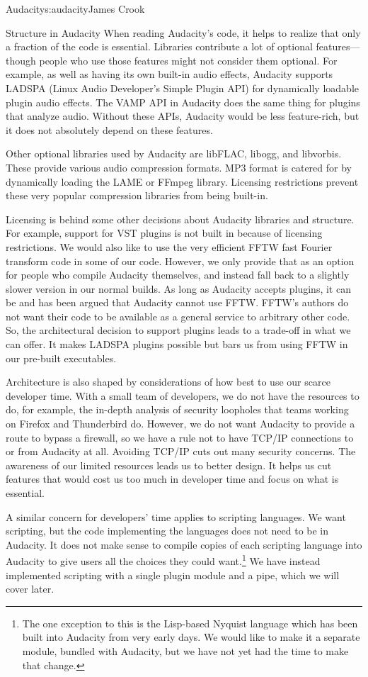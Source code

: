 \begin{aosachapter}{Audacity}{s:audacity}{James Crook}
\begin{aosasect1}{Structure in Audacity}
When reading Audacity's code,
it helps to realize that only a fraction of the code is essential.
Libraries contribute a lot of optional features---though people who
use those features might not consider them optional.  For example, as
well as having its own built-in audio effects, Audacity supports
LADSPA (Linux Audio Developer's Simple Plugin API) for dynamically
loadable plugin audio effects.  The VAMP API in Audacity does the same
thing for plugins that analyze audio.  Without these APIs, Audacity
would be less feature-rich, but it does not absolutely depend on these
features.

Other optional libraries used by Audacity are libFLAC, libogg,
and libvorbis.  These provide various audio compression formats.  MP3
format is catered for by dynamically loading the LAME or FFmpeg
library.  Licensing restrictions prevent these very popular
compression libraries from being built-in.

Licensing is behind some other decisions about Audacity libraries and
structure.  For example, support for VST plugins
is not built in because of licensing restrictions.
We would also like to use the very efficient FFTW
fast Fourier transform code in some of our code.  However, we only
provide that as an option for people who compile Audacity themselves,
and instead fall back to a slightly slower version in our normal
builds.  As long as Audacity accepts plugins, it can be and has been
argued that Audacity cannot use FFTW\@.  FFTW's authors do not want
their code to be available as a general service to arbitrary other
code.  So, the architectural decision to support plugins leads to a
trade-off in what we can offer.  It makes LADSPA plugins possible but
bars us from using FFTW in our pre-built executables.

Architecture is also shaped by considerations of how best to use our
scarce developer time.  With a small team of developers, we do not
have the resources to do, for example, the in-depth analysis of
security loopholes that teams working on Firefox and Thunderbird do.
However, we do not want Audacity to provide a route to bypass a
firewall, so we have a rule not to have TCP/IP connections to or from
Audacity at all.  Avoiding TCP/IP cuts out many security concerns.
The awareness of our limited resources leads us to better design.  
It helps us cut features that would cost us too much in developer 
time and focus on what is essential.

A similar concern for developers' time applies to scripting languages.
We want scripting, but the code implementing the languages does not
need to be in Audacity.  It does not make sense to compile copies of
each scripting language into Audacity to give users all the choices
they could want.\footnote{The one exception to this is the Lisp-based
Nyquist language which has been built into Audacity from very early
days.  We would like to make it a separate module, bundled with
Audacity, but we have not yet had the time to make that change.}
We have instead implemented scripting with a single plugin module and a
pipe, which we will cover later.


\end{aosasect1}
\end{aosachapter}
